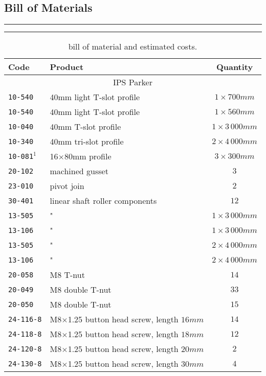 
\begin{table}[p]
	\subsection{Bill of Materials}
	\rule{\linewidth}{2pt}
	\caption{bill of material and estimated costs.}
	\label{tab:BOM}
	\rule{\linewidth}{1pt} \vspace{0mm}	
	
	\begin{center}
	\begin{tabular}{l p{7.3cm} c}
	\textbf{Code} & \textbf{Product} & \textbf{Quantity} \\ \hline
	\multicolumn{3}{c}{IPS Parker} \\
		\texttt{10-540} & 40mm light T-slot profile & $1 \times 700mm$ \\
		\texttt{10-540} & 40mm light T-slot profile & $1 \times 560mm$ \\
		\texttt{10-040} & 40mm T-slot profile & $1\times 3\,000mm$ \\
		\texttt{10-340} & 40mm tri-slot profile & $2\times 4\,000mm$ \\
		\texttt{10-081$^1$} & 16$\times$80mm profile & $3\times 300mm$ \\
		\texttt{20-102} & machined gusset & $3$ \\
		\texttt{23-010} & pivot join & $2$ \\
		\texttt{30-401} & linear shaft roller components & $12$ \\
		\texttt{13-505} & " & $1\times 3\,000mm$ \\
		\texttt{13-106} & " & $1\times 3\,000mm$ \\
		\texttt{13-505} & " & $2\times 4\,000mm$ \\
		\texttt{13-106} & " & $2\times 4\,000mm$ \\
		\texttt{20-058} & M8 T-nut & $14$ \\
		\texttt{20-049} & M8 double T-nut  & $33$ \\
		\texttt{20-050} & M8 double T-nut  & $15$ \\
		\texttt{24-116-8} & M8$\times$1.25 button head screw, length $16mm$ & $14$ \\
		\texttt{24-118-8} & M8$\times$1.25 button head screw, length $18mm$ & $12$ \\
		\texttt{24-120-8} & M8$\times$1.25 button head screw, length $20mm$ & $2$ \\
		\texttt{24-130-8} & M8$\times$1.25 button head screw, length $30mm$ & $4$ \\

\end{tabular}
\end{center}
\end{table}
